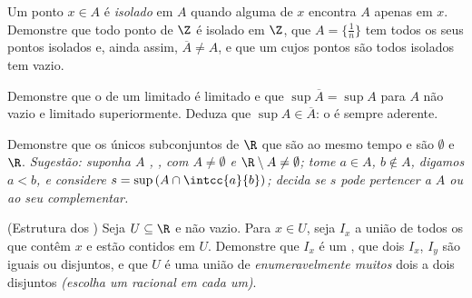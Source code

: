 \begin{exercise}[$\star\star$]\label{exo:b1:topology:7}
Um ponto $x \in A$ é \emph{isolado} em $A$ quando alguma  de
$x$ encontra $A$ apenas em $x$. Demonstre que todo ponto de $\Z$ é
isolado em $\Z$, que $A = \{\frac1n\}$ tem todos os seus pontos isolados e,
ainda assim, $\overline A \neq A$, e que um  cujos pontos são todos
isolados tem  vazio.
\end{exercise}

\begin{exercise}[$\star\star$]\label{exo:b1:topology:8}
Demonstre que o  de um  limitado é limitado e que
$\sup \overline A = \sup A$ para $A$ não vazio e limitado superiormente. Deduza
que $\sup A \in \overline A$: o  é sempre aderente.
\end{exercise}

\begin{exercise}[$\star\star\star$]\label{exo:b1:topology:9}
Demonstre que os únicos subconjuntos de $\R$ que são ao mesmo tempo
 e  são $\emptyset$ e $\R$. \emph{Sugestão: suponha $A$
, , com $A \neq \emptyset$ e $\R \setminus A \neq \emptyset$; tome $a \in
A$, $b \notin A$, digamos $a < b$, e considere $s = \sup\,(A \cap
\intcc{a}{b})$; decida se $s$ pode pertencer a $A$ ou ao seu
complementar.}
\end{exercise}

\begin{exercise}[$\star\star\star$]\label{exo:b1:topology:10}
(Estrutura dos ) Seja $U \subseteq \R$  e não vazio. Para
$x \in U$, seja $I_x$ a união de todos os   que contêm
$x$ e estão contidos em $U$. Demonstre que $I_x$ é um  ,
que dois  $I_x$, $I_y$ são iguais ou disjuntos, e que $U$ é
uma união de \emph{enumeravelmente muitos}   dois a
dois disjuntos \emph{(escolha um racional em cada um)}.
\end{exercise}

